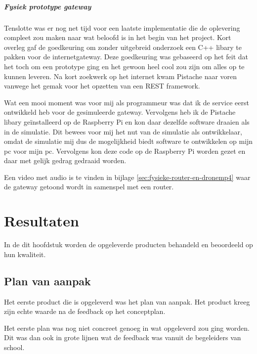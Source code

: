 \documentclass[a4paper, 11pt, oneside]{report}
\begin{document}
\paragraph{Fysiek prototype gateway}

Tenslotte was er nog net tijd voor een laatste implementatie die de oplevering compleet zou maken naar wat beloofd is in het begin van het project.
Kort overleg gaf de goedkeuring om zonder uitgebreid onderzoek een C++ libary te pakken voor de internetgateway.
Deze goedkeuring was gebaseerd op het feit dat het toch om een prototype ging en het gewoon heel cool zou zijn om alles op te kunnen leveren.
Na kort zoekwerk op het internet kwam Pistache \cite{pisrest} naar voren vanwege het gemak voor het opzetten van een REST framework.

Wat een mooi moment was voor mij als programmeur was dat ik de service eerst ontwikkeld heb voor de gesimuleerde gateway.
Vervolgens heb ik de Pistache libary geïnstalleerd op de Raspberry Pi en kon daar dezelfde software draaien als in de simulatie.
Dit bewees voor mij het nut van de simulatie als ontwikkelaar, omdat de simulatie mij dus de mogelijkheid biedt software te ontwikkelen op mijn pc voor mijn pc.
Vervolgens kon deze code op de Raspberry Pi worden gezet en daar met gelijk gedrag gedraaid worden.

Een video met audio is te vinden in bijlage \ref{sec:fysieke-router-en-dronemp4} waar de gateway getoond wordt in samenspel met een router.

\chapter{Resultaten}\label{sec:resultaten}

In de dit hoofdstuk worden de opgeleverde producten behandeld en beoordeeld op hun kwaliteit.

\section{Plan van aanpak}\label{sec:plan-van-aanpak}
Het eerste product die is opgeleverd was het plan van aanpak.
Het product kreeg zijn echte waarde na de feedback op het conceptplan.

Het eerste plan was nog niet concreet genoeg in wat opgeleverd zou ging worden. 
Dit was dan ook in grote lijnen wat de feedback was vanuit de begeleiders van school.
\end{document}

